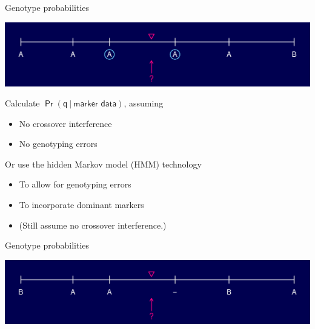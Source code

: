 \documentclass[12pt]{article}
\newcommand{\headsize}{\fontsize{35}{35} \selectfont}
\newcommand{\smallersize}{\fontsize{20}{25} \selectfont}
\begin{document}
\newpage

\addtocounter{page}{-1}

\headsize \color{myyellow}
\hfill \begin{minipage}{5.75in}
\centering
Genotype probabilities
\end{minipage}

\vspace{15mm}

\centerline{\includegraphics{Figs/genoprob2.pdf}}

\vspace{15mm}

\hfill
\begin{minipage}{10in}
\color{mywhite} \smallersize
Calculate {\color{myblue} $\mathsf{\Pr(q \ | \ \text{marker data})}$}, assuming
\begin{itemize}
\item No crossover interference
\item No genotyping errors
\end{itemize}

\vspace{10mm}

Or use the {\color{mypink} hidden Markov model (HMM)} technology
\begin{itemize}
\item To allow for genotyping errors
\item To incorporate dominant markers
\item {\color{myblue} (Still assume no crossover interference.)}
\end{itemize}
\end{minipage}

\newpage

\addtocounter{page}{-1}

\headsize \color{myyellow}
\hfill \begin{minipage}{5.75in}
\centering
Genotype probabilities
\end{minipage}

\vspace{15mm}

\centerline{\includegraphics{Figs/genoprob3.pdf}}
\end{document}
